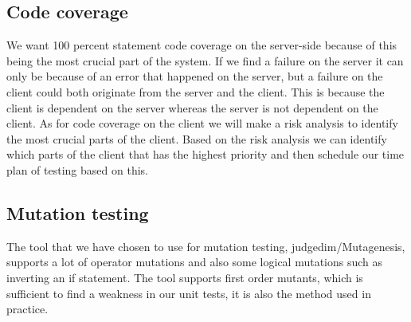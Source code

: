 \documentclass[a4paper,12pt]{memoir}
\begin{document}
\subsection{Code coverage}
We want 100 percent statement code coverage on the server-side because of this being the most crucial part of the system. If we find a failure on the server it can only be because of an error that happened on the server, but a failure on the client could both originate from the server and the client. This is because the client is dependent on the server whereas the server is not dependent on the client. As for code coverage on the client we will make a risk analysis to identify the most crucial parts of the client. Based on the risk analysis we can identify which parts of the client that has the highest priority and then schedule our time plan of testing based on this.

\subsection{Mutation testing} %
The tool that we have chosen to use for mutation testing, judgedim/Mutagenesis, supports a lot of operator mutations and also some logical mutations such as inverting an if statement. The tool supports first order mutants, which is sufficient to find a weakness in our unit tests, it is also the method used in practice. 
\end{document}
